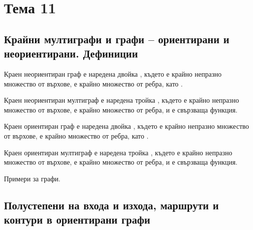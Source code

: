 \section{Тема 11}

\subsection*{Крайни мултиграфи и графи – ориентирани и неориентирани. Дефиниции}

\begin{definition}
    Краен неориентиран граф е наредена двойка , където  е 
    крайно непразно множество от върхове,  е крайно множество от ребра, като 
    .
\end{definition}

\begin{definition}
    Краен неориентиран мултиграф е наредена тройка , където 
     е крайно непразно множество от върхове,  
    е крайно множество от ребра,  и  
    е свързваща функция.
\end{definition}

\begin{definition}
    Краен ориентиран граф е наредена двойка , където  е 
    крайно непразно множество от върхове,  е крайно множество от ребра, като 
    .
\end{definition}

\begin{definition}
    Краен ориентиран мултиграф е наредена тройка , където 
     е крайно непразно множество от върхове,  
    е крайно множество от ребра,  и  
    е свързваща функция.
\end{definition}

\begin{note}
    Примери за графи.
\end{note}

\subsection*{Полустепени на входа и изхода, маршрути и контури в ориентирани графи}


